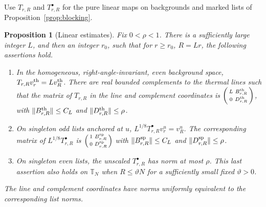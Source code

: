 \documentclass[11pt]{article}
\newtheorem{proposition}{Proposition}[section]
\theoremstyle{definition}
\begin{document}
Use \(T_{r,R}\) and \(T^\bullet_{r,R}\) for the pure linear maps on
backgrounds and marked lists of Proposition~\ref{prop:blocking}.

\begin{proposition}[Linear estimates]\label{prop:linear}
Fix \(0<\rho<1\). There is a sufficiently large integer \(L\), and
then an integer \(r_0\), such that for \(r\ge r_0\), \(R=Lr\), the
following assertions hold.
\begin{enumerate}
\item In the homogeneous, right-angle-invariant, even background
space, \(T_{r,R}v_r^{\rm th}=Lv_R^{\rm th}\). There are real
bounded complements to the thermal lines such that the matrix
of \(T_{r,R}\) in the line and complement coordinates is
\(\left(\begin{smallmatrix}L&B^{\rm th}_{r,R}\\0&D^{\rm th}_{r,R}\end{smallmatrix}\right)\),
with \(\|B^{\rm th}_{r,R}\|\le C_L\) and
\(\|D^{\rm th}_{r,R}\|\le\rho\).
\item On singleton odd lists anchored at \(u\),
\(L^{1/8}T^\bullet_{r,R}v_r^u=v_R^u\). The corresponding matrix of
\(L^{1/8}T^\bullet_{r,R}\) is
\(\left(\begin{smallmatrix}1&B^{\rm sp}_{r,R}\\0&D^{\rm sp}_{r,R}\end{smallmatrix}\right)\)
with \(\|B^{\rm sp}_{r,R}\|\le C_L\) and \(\|D^{\rm sp}_{r,R}\|\le\rho\).
\item On singleton even lists, the unscaled \(T^\bullet_{r,R}\)
has norm at most \(\rho\). This last assertion also holds on
\(\mathbb T_N\) when \(R\le\vartheta N\) for a sufficiently small
fixed \(\vartheta>0\).
\end{enumerate}
The line and complement coordinates have norms uniformly equivalent
to the corresponding list norms.
\end{proposition}
\end{document}
